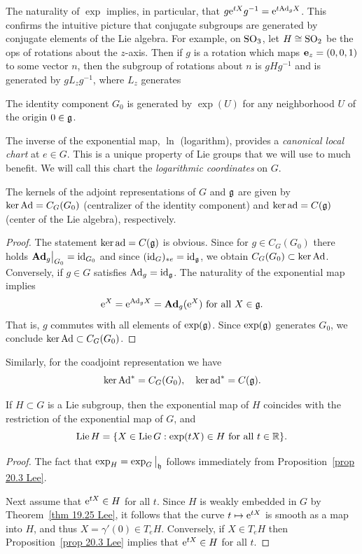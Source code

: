 \begin{rem}
    The naturality of $\exp$ implies, in particular, that $g\rme^{tX}g^{-1}=\rme^{t\Ad_g X}$. This confirms the intuitive picture that conjugate subgroups are generated by conjugate elements of the Lie algebra. For example, on $\SO_3$, let $H\cong\SO_2$ be the \gls{ops} of rotations about the $z$-axis. Then if $g$ is a rotation which maps $\bf{e}_z=(0,0,1)$ to some vector $n$, then the subgroup of rotations about $n$ is $gHg^{-1}$ and is generated by $gL_z g^{-1}$, where $L_z$ generates 
\end{rem}
\begin{cor}
    The identity component $G_0$ is generated by $\exp(U)$ for any neighborhood $U$ of the origin $0\in\frakg$.
\end{cor}
 

\begin{rem}
    The inverse of the exponential map, $\ln$ (logarithm), provides a \emph{canonical local chart} at $e\in G$. This is a unique property of Lie groups that we will use to much benefit. We will call this chart the \emph{logarithmic coordinates} on $G$.
\end{rem}


\begin{prop}\label{prop 5.4.5 RS1 ker(Ad) and ker(ad)}
    The kernels of the adjoint representations of $G$ and $\frakg$ are given by $\ker \Ad=C_G(G_0)$ (centralizer of the identity component) and $\ker \ad=C(\frakg)$ (center of the Lie algebra), respectively.
\end{prop}
\begin{proof}
    The statement $\ker\ad=C(\frakg)$ is obvious. Since for $g\in C_G(G_0)$ there holds $\restr{\Adg_g}{G_0}=\id_{G_0}$ and since $(\id_G)_{\ast e}=\id_\frakg$, we obtain $C_G(G_0)\subset \ker\Ad$. Conversely, if $g\in G$ satisfies $\Ad_g=\id_\frakg$. The naturality of the exponential map implies 
    \[\rme^X=\rme^{\Ad_g X}=\Adg_g(\rme^X)\text{ for all }X\in\frakg.\]
    That is, $g$ commutes with all elements of $\exp(\frakg)$. Since $\exp(\frakg)$ generates $G_0$, we conclude $\ker\Ad\subset C_G(G_0)$.
\end{proof}

Similarly, for the coadjoint representation we have
\[\ker \Ad^\ast=C_G(G_0),\quad \ker\ad^\ast=C(\frakg).\]

\begin{prop}\label{prop 20.9 Lee}
    If $H\subset G$ is a Lie subgroup, then the exponential map of $H$ coincides with the restriction of the exponential map of $G$, and 
    \[\Lief H=\{X\in\Lief G: \exp(tX)\in H \text{ for all } t\in \bbR\}.\]
\end{prop}
\begin{proof}
    The fact that $\exp_H=\restr{\exp_G}{\frakh}$ follows immediately from Proposition~\ref{prop 20.3 Lee}.

    Next assume that $\rme^{tX}\in H$ for all $t$. Since $H$ is weakly embedded in $G$ by Theorem~\ref{thm 19.25 Lee}, it follows that the curve $t\mapsto \rme^{tX}$ is smooth as a map into $H$, and thus $X=\gamma'(0)\in T_eH$. Conversely, if $X\in T_e H$ then Proposition~\ref{prop 20.3 Lee} implies that $\rme^{tX}\in H$ for all $t$.
\end{proof}


